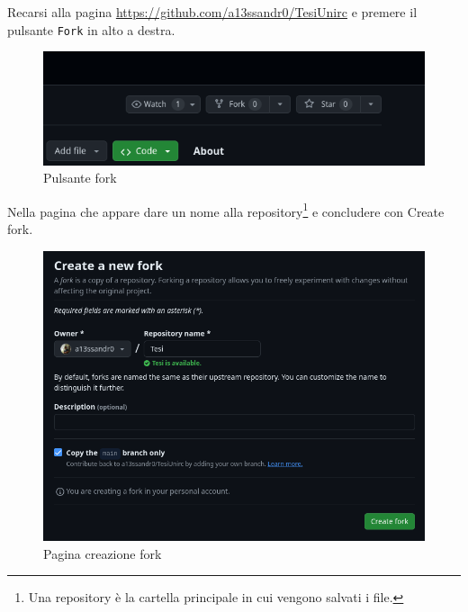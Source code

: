 \documentclass[envcountsame,envcountchap]{svmono}
\begin{document}
Recarsi alla pagina \url{https://github.com/a13ssandr0/TesiUnirc} e premere il pulsante 
{\tt Fork} in alto a destra.
\begin{figure}[H]
    \centering
    \includegraphics[width=\linewidth]{images/github/fork.png}
    \caption{Pulsante fork}
    \label{pulsante_fork}
\end{figure}

Nella pagina che appare dare un nome alla repository\footnote{Una repository è la 
cartella principale in cui vengono salvati i file.} e concludere con Create fork.
\begin{figure}[H]
    \centering
    \includegraphics[width=\linewidth]{images/github/new_fork.png}
    \caption{Pagina creazione fork}
    \label{pagina_fork}
\end{figure}

\newpage \label{nuova_pagina}
\end{document}
